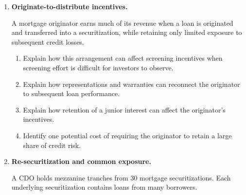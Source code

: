 \begin{enumerate}
\begin{enumerate}

\item Calculate the amount and ratio of overcollateralization.

\item Calculate the combined nominal amount of overcollateralization and the reserve account before considering the detailed waterfall.

\item Calculate the guarantee payment when an eligible shortfall is RMB~12 million and when it is RMB~40 million.

\item Distinguish the sources of protection provided by overcollateralization, the reserve account, and the guarantee.

\item Explain why these amounts cannot necessarily be added to obtain a single measure of realized protection.

\end{enumerate}


\item \textbf{Originate-to-distribute incentives.}

A mortgage originator earns much of its revenue when a loan is originated and transferred into a securitization, while retaining only limited exposure to subsequent credit losses.

\begin{enumerate}
\item Explain how this arrangement can affect screening incentives when screening effort is difficult for investors to observe.

\item Explain how representations and warranties can reconnect the originator to subsequent loan performance.

\item Explain how retention of a junior interest can affect the originator's incentives.

\item Identify one potential cost of requiring the originator to retain a large share of credit risk.

\end{enumerate}


\item \textbf{Re-securitization and common exposure.}

A CDO holds mezzanine tranches from 30 mortgage securitizations. Each underlying securitization contains loans from many borrowers.


\end{enumerate}
